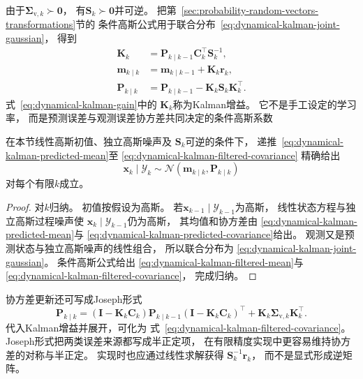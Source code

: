 由于$\bm{\Sigma}_{\mathrm{v},k}\succ\bm{0}$， 有$\bm{S}_{k}\succ\bm{0}$并可逆。 把第~\ref{sec:probability-random-vectors-transformations}节的
条件高斯公式用于联合分布~\eqref{eq:dynamical-kalman-joint-gaussian}， 得到
\begin{align}
	\bm{K}_{k}       & = \bm{P}_{k\mid k-1}\bm{C}_{k}^{\top}\bm{S}_{k}^{-1}, \label{eq:dynamical-kalman-gain}                       \\
	\bm{m}_{k\mid k} & = \bm{m}_{k\mid k-1}+\bm{K}_{k}\bm{r}_{k}, \label{eq:dynamical-kalman-filtered-mean}                         \\
	\bm{P}_{k\mid k} & = \bm{P}_{k\mid k-1}- \bm{K}_{k}\bm{S}_{k}\bm{K}_{k}^{\top}. \label{eq:dynamical-kalman-filtered-covariance}
\end{align}
式~\eqref{eq:dynamical-kalman-gain}中的 $\bm{K}_{k}$称为Kalman增益。 它不是手工设定的学习率，
而是预测误差与观测误差协方差共同决定的条件高斯系数

\begin{theorem}[有限时域Kalman滤波]
	\label{thm:dynamical-finite-horizon-kalman-filter} 在本节线性高斯初值、独立高斯噪声及
	$\bm{S}_{k}$可逆的条件下， 递推~\eqref{eq:dynamical-kalman-predicted-mean}至
	\eqref{eq:dynamical-kalman-filtered-covariance} 精确给出
	\[
		\bm{x}_{k}\mid\mathcal{Y}_{k}\sim \mathcal{N}( \bm{m}_{k\mid k}, \bm{P}_{k\mid
		k})
	\]
	对每个有限$k$成立。
\end{theorem}

\begin{proof}
	对$k$归纳。 初值按假设为高斯。 若$\bm{x}_{k-1}\mid\mathcal{Y}_{k-1}$为高斯，
	线性状态方程与独立高斯过程噪声使 $\bm{x}_{k}\mid\mathcal{Y}_{k-1}$仍为高斯，
	其均值和协方差由 \eqref{eq:dynamical-kalman-predicted-mean}与 \eqref{eq:dynamical-kalman-predicted-covariance}给出。
	观测又是预测状态与独立高斯噪声的线性组合， 所以联合分布为 \eqref{eq:dynamical-kalman-joint-gaussian}。
	条件高斯公式给出 \eqref{eq:dynamical-kalman-filtered-mean}与 \eqref{eq:dynamical-kalman-filtered-covariance}，
	完成归纳。
\end{proof}

协方差更新还可写成Joseph形式
\begin{equation}
	\bm{P}_{k\mid k}= (\bm{I}-\bm{K}_{k}\bm{C}_{k}) \bm{P}_{k\mid k-1}(\bm{I}-\bm{K}
	_{k}\bm{C}_{k})^{\top}+ \bm{K}_{k}\bm{\Sigma}_{\mathrm{v},k}\bm{K}_{k}^{\top}. \label{eq:dynamical-kalman-joseph-form}
\end{equation}
代入Kalman增益并展开，可化为 式~\eqref{eq:dynamical-kalman-filtered-covariance}。
Joseph形式把两类误差来源都写成半正定项，
在有限精度实现中更容易维持协方差的对称与半正定。 实现时也应通过线性求解获得
$\bm{S}_{k}^{-1}\bm{r}_{k}$， 而不是显式形成逆矩阵。


